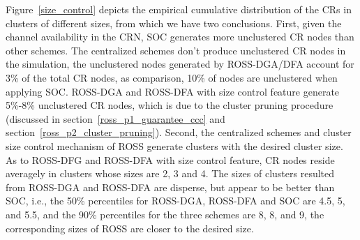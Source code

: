 \documentclass[10pt,journal,compsoc]{IEEEtran}
\theoremstyle{mytheoremstyle}
\theoremstyle{mytheoremstyle}
\theoremstyle{mytheoremstyle}
\newcommand{\ie}{i.e., }
\begin{document}
Figure~\ref{size_control} depicts the empirical cumulative distribution of the CRs in clusters of different sizes, from which we have two conclusions.
First, given the channel availability in the CRN, SOC generates more unclustered CR nodes than other schemes.
The centralized schemes don't produce unclustered CR nodes in the simulation, the unclustered nodes generated by ROSS-DGA/DFA account for 3\% of the total CR nodes, as comparison, 10\% of nodes are unclustered when applying SOC.
ROSS-DGA and ROSS-DFA with size control feature generate 5\%-8\% unclustered CR nodes, which is due to the cluster pruning procedure (discussed in section~\ref{ross_p1_guarantee_ccc} and section~\ref{ross_p2_cluster_pruning}).
Second, the centralized schemes and cluster size control mechanism of ROSS generate clusters with the desired cluster size.
As to ROSS-DFG and ROSS-DFA with size control feature, CR nodes reside averagely in clusters whose sizes are 2, 3 and 4.
The sizes of clusters resulted from ROSS-DGA and ROSS-DFA are disperse, but appear to be better than SOC, i.e., the 50\% percentiles for ROSS-DGA, ROSS-DFA and SOC are 4.5, 5, and 5.5, and the 90\% percentiles for the three schemes are 8, 8, and 9, the corresponding sizes of ROSS are closer to the desired size.
\end{document}
